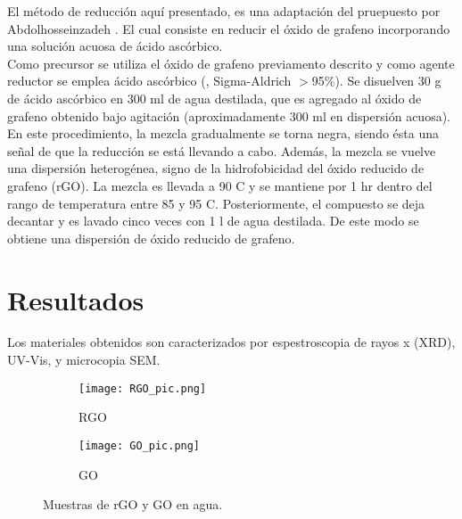 El método de reducción aquí presentado, es una adaptación del pruepuesto por Abdolhosseinzadeh \citep{Abdolhosseinzadeh2015}. El cual consiste en reducir el óxido de grafeno incorporando una solución acuosa de ácido ascórbico.
\\
Como precursor se utiliza el óxido de grafeno previamento descrito y como agente reductor se emplea ácido ascórbico (, Sigma-Aldrich $>$95\%). Se disuelven 30 g de ácido ascórbico en 300 ml de agua destilada, que es agregado al óxido de grafeno obtenido bajo agitación (aproximadamente 300 ml en dispersión acuosa). En este procedimiento, la mezcla gradualmente se torna negra, siendo ésta una señal de que la reducción se está llevando a cabo. Además, la mezcla se vuelve una dispersión heterogénea, signo de la hidrofobicidad del óxido reducido de grafeno (rGO). La mezcla es llevada a 90 \degree C y se mantiene por 1 hr dentro del rango de temperatura entre 85 y 95 \degree C. Posteriormente, el compuesto se deja decantar y es lavado cinco veces con 1 l de agua destilada. De este modo se obtiene una dispersión de óxido reducido de grafeno.

\section{Resultados}
Los materiales obtenidos son caracterizados por espestroscopia de rayos x (XRD), UV-Vis, y microcopia SEM.

\begin{figure}
	\centering
	\begin{subfigure}{0.4\textwidth}
		\texttt{[image: RGO\_pic.png]}
		\caption{RGO}
		\label{fig:RGO}
	\end{subfigure}
	\begin{subfigure}{0.42\textwidth}
		\texttt{[image: GO\_pic.png]}
		\caption{GO}
		\label{fig:GO}
	\end{subfigure}
	\caption{Muestras de rGO y GO en agua.}
\end{figure}


